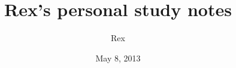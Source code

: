 \documentclass[12pt]{article}
\begin{document}
\title{Rex's personal study notes} 
\author{Rex} 
\date{May 8, 2013} 
\maketitle 




 

 

 

 

\newpage
\glsaddall
\printglossary

\printglossary[type=\acronymtype]

\newpage 

%  
%  
%   

\nocite{*}


\end{document}
